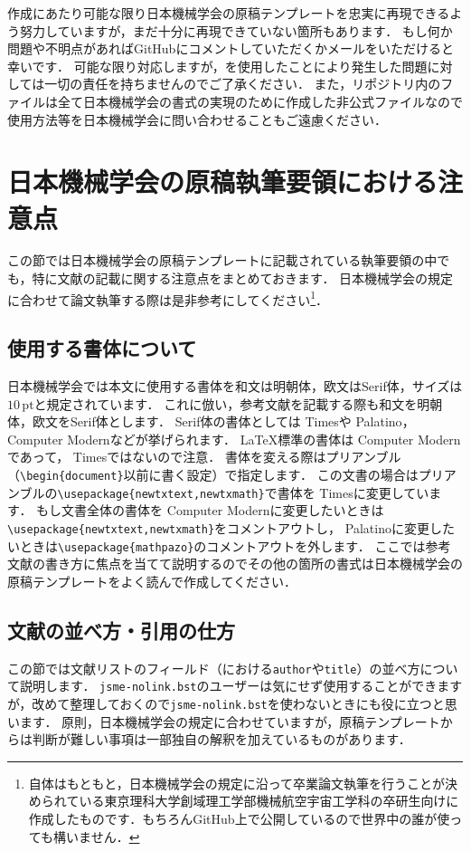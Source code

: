 \documentclass[a4paper,fleqn,uplatex,dvipdfmx]{jsarticle}
\newcommand{\jsmefile}{\texttt{jsme-nolink.bst}}
\begin{document}
\JSMErepos 作成にあたり可能な限り日本機械学会の原稿テンプレートを忠実に再現できるよう努力していますが，まだ十分に再現できていない箇所もあります．
もし何か問題や不明点があればGitHubにコメントしていただくかメールをいただけると幸いです．
可能な限り対応しますが，\JSMErepos を使用したことにより発生した問題に対しては一切の責任を持ちませんのでご了承ください．
また，\JSMErepos リポジトリ内のファイルは全て日本機械学会の書式の実現のために作成した非公式ファイルなので使用方法等を日本機械学会に問い合わせることもご遠慮ください．


\section{日本機械学会の原稿執筆要領における注意点}
\label{sec:caution}
この節では日本機械学会の原稿テンプレートに記載されている執筆要領の中でも，特に文献の記載に関する注意点をまとめておきます．
日本機械学会の規定に合わせて論文執筆する際は是非参考にしてください\footnote{\JSMErepos 自体はもともと，日本機械学会の規定に沿って卒業論文執筆を行うことが決められている東京理科大学創域理工学部機械航空宇宙工学科の卒研生向けに作成したものです．もちろんGitHub上で公開しているので世界中の誰が使っても構いません．}．

\subsection{使用する書体について}
日本機械学会では本文に使用する書体を和文は明朝体，欧文はSerif体，サイズは$10\,\mathrm{pt}$と規定されています．
これに倣い，参考文献を記載する際も和文を明朝体，欧文をSerif体とします．
Serif体の書体としては{ Times}や{ Palatino}，{ Computer Modern}などが挙げられます．
\LaTeX{}標準の書体は{ Computer Modern}であって，{ Times}ではないので注意．
書体を変える際はプリアンブル（\verb|\begin{document}|以前に書く設定）で指定します．
この文書の場合はプリアンブルの\verb|\usepackage{newtxtext,newtxmath}|で書体を{ Times}に変更しています．
もし文書全体の書体を{ Computer Modern}に変更したいときは\verb|\usepackage{newtxtext,newtxmath}|をコメントアウトし，{ Palatino}に変更したいときは\verb|\usepackage{mathpazo}|のコメントアウトを外します．
ここでは参考文献の書き方に焦点を当てて説明するのでその他の箇所の書式は日本機械学会の原稿テンプレートをよく読んで作成してください．

\subsection{文献の並べ方・引用の仕方}
この節では文献リストのフィールド（\BibTeX{}における\verb|author|や\verb|title|）の並べ方について説明します．
\jsmefile のユーザーは気にせず使用することができますが，改めて整理しておくので\jsmefile を使わないときにも役に立つと思います．
原則，日本機械学会の規定に合わせていますが，原稿テンプレートからは判断が難しい事項は一部独自の解釈を加えているものがあります．
\end{document}
